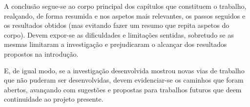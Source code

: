 \begin{conclusion}


A conclusão segue-se ao corpo principal dos capítulos que constituem o trabalho, realçando, de forma resumida e nos aspetos mais relevantes, os passos seguidos e os resultados obtidos (mas evitando fazer um resumo que repita aspetos do corpo). Devem expor-se as dificuldades e limitações sentidas, sobretudo se as mesmas limitaram a investigação e prejudicaram o alcançar dos resultados propostos na introdução. 

E, de igual modo, se a investigação desenvolvida mostrou novas vias de trabalho que não puderam ser desenvolvidas, devem evidenciar-se os caminhos que foram abertos, avançando com sugestões e propostas para trabalhos futuros que deem continuidade ao projeto presente.

\end{conclusion}